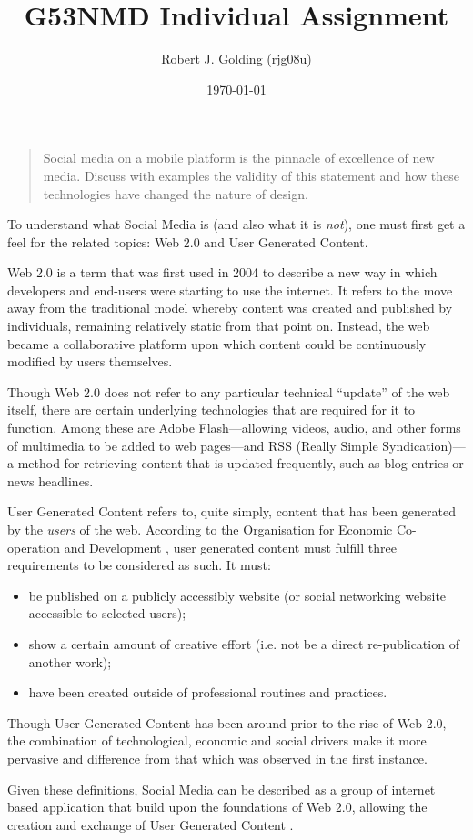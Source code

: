 \documentclass[a4paper,11pt]{article}
\title{G53NMD Individual Assignment}
\author{Robert J. Golding (rjg08u)} \date{\today}
\begin{document}
    \maketitle

    \begin{quote}
        Social media on a mobile platform is the pinnacle of excellence of new
        media. Discuss with examples the validity of this statement and how
        these technologies have changed the nature of design.
    \end{quote}

    To understand what Social Media is (and also what it is \emph{not}), one
    must first get a feel for the related topics: Web 2.0 and User Generated
    Content. \cite{kaplan2010}

    Web 2.0 is a term that was first used in 2004 to describe a new way in
    which developers and end-users were starting to use the internet. It refers
    to the move away from the traditional model whereby content was created and
    published by individuals, remaining relatively static from that point on.
    Instead, the web became a collaborative platform upon which content could
    be continuously modified by users themselves.

    Though Web 2.0 does not refer to any particular technical ``update'' of the
    web itself, there are certain underlying technologies that are required for
    it to function. Among these are Adobe Flash---allowing videos, audio, and
    other forms of multimedia to be added to web pages---and RSS (Really Simple
    Syndication)---a method for retrieving content that is updated frequently,
    such as blog entries or news headlines.

    User Generated Content refers to, quite simply, content that has been
    generated by the \emph{users} of the web. According to the Organisation for
    Economic Co-operation and Development \cite{vickery2007}, user generated
    content must fulfill three requirements to be considered as such. It must:

    \begin{itemize}
        \item be published on a publicly accessibly website (or social
            networking website accessible to selected users);
        \item show a certain amount of creative effort (i.e. not be a direct
            re-publication of another work);
        \item have been created outside of professional routines and practices.
    \end{itemize}

    Though User Generated Content has been around prior to the rise of Web 2.0,
    the combination of technological, economic and social drivers make it more
    pervasive and difference from that which was observed in the first
    instance.

    Given these definitions, Social Media can be described as a group of
    internet based application that build upon the foundations of Web 2.0,
    allowing the creation and exchange of User Generated Content
    \cite{kaplan2010}.

    
    
\end{document}
